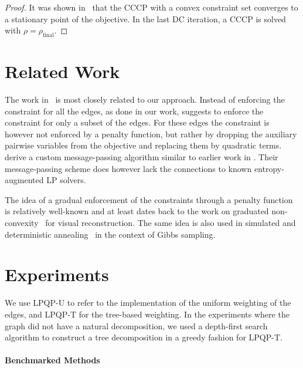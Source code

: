 \begin{proof}
It was shown in~\parencite{Sriperumbudur2009} that the \ac{CCCP} with a convex constraint 
set converges to a stationary point of the objective. In the last \ac{DC} iteration, 
a \ac{CCCP} is solved with $\rho=\rho_{\text{final}}$.
\end{proof}



\section{Related Work}

The work in~\parencite{Kumar2012} is most closely related to our approach.
Instead of enforcing the constraint for all the edges, as done in our work,
\parencite{Kumar2012} suggests to enforce the constraint for only a subset of
the edges. For these edges the constraint is however not enforced by a penalty
function, but rather by dropping the auxiliary pairwise variables from
the objective and replacing them by quadratic terms. \textcite{Kumar2012}
derive a custom message-passing algorithm similar to earlier work in
\parencite{Kumar2011}. Their message-passing scheme does however lack the
connections to known entropy-augmented \ac{LP} solvers.

The idea of a gradual enforcement of the constraints through a penalty
function is relatively well-known and at least dates back to the work on
graduated non-convexity~\parencite{Blake1987} for visual reconstruction. The
same idea is also used in simulated and deterministic
annealing~\parencite{Kirkpatrick1983,Hofmann1997} in the context of Gibbs
sampling.


\section{Experiments}

We use \acs{LPQP-U} to
refer to the implementation of the uniform weighting of the edges, and 
\acs{LPQP-T} for the tree-based weighting. In the experiments where the 
graph did not have a natural decomposition, we used a 
depth-first search algorithm to construct a tree decomposition in a greedy
fashion for \acs{LPQP-T}.

\paragraph{Benchmarked Methods}

